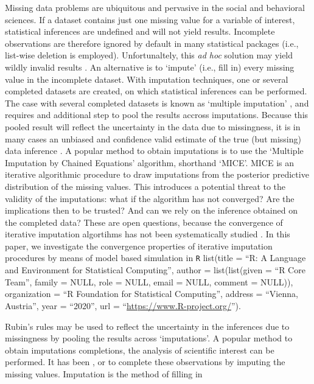 \documentclass[Royal,times,sageh]{sagej}
\begin{document}
Missing data problems are ubiquitous and pervasive in the social and
behavioral sciences. If a dataset contains just one missing value for a
variable of interest, statistical inferences are undefined and will not
yield results. Incomplete observations are therefore ignored by default
in many statistical packages (i.e., list-wise deletion is employed).
Unfortunaltely, this \emph{ad hoc} solution may yield wildly invalid
results \citep{buur18}. An alternative is to `impute' (i.e., fill in)
every missing value in the incomplete dataset. With imputation
techniques, one or several completed datasets are created, on which
statistical inferences can be performed. The case with several completed
datasets is known as `multiple imputation' \citep[MI;][]{rubin76}, and
requires and additional step to pool the results accross imputations.
Because this pooled result will reflect the uncertainty in the data due
to missingness, it is in many cases an unbiased and confidence valid
estimate of the true (but missing) data inference \citep{buur18}. A
popular method to obtain imputations is to use the `Multiple Imputation
by Chained Equations' algorithm, shorthand `MICE'. MICE is an iterative
algorithmic procedure to draw imputations from the posterior predictive
distribution of the missing values. This introduces a potential threat
to the validity of the imputations: what if the algorithm has not
converged? Are the implications then to be trusted? And can we rely on
the inference obtained on the completed data? These are open questions,
because the convergence of iterative imputation algortihms has not been
systematically studied \citep{buur18}. In this paper, we investigate the
convergence properties of iterative imputation procedures by means of
model based simulation in \texttt{R} list(title = ``R: A Language and
Environment for Statistical Computing'', author = list(list(given = ``R
Core Team'', family = NULL, role = NULL, email = NULL, comment = NULL)),
organization = ``R Foundation for Statistical Computing'', address =
``Vienna, Austria'', year = ``2020'', url =
``\url{https://www.R-project.org/}'').

Rubin's rules \citeyearpar{rubin76} may be used to reflect the
uncertainty in the inferences due to missingness by pooling the results
across `imputations'. A popular method to obtain imputations
completions, the analysis of scientific interest can be performed. It
has been , or to complete these observations by imputing the missing
values. Imputation is the method of filling in
\end{document}
